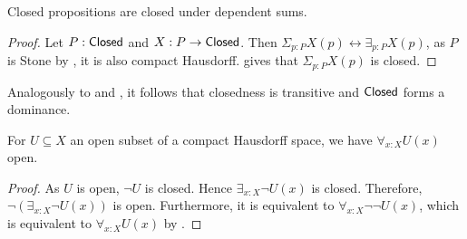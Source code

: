 \begin{corollary}\label{ClosedDependentSums}
  Closed propositions are closed under dependent sums. 
\end{corollary}
\begin{proof}
  Let $P:\mathsf{Closed}$ and $X:P \to \mathsf{Closed}$. 
  Then $\Sigma_{p:P} X(p) \leftrightarrow \exists_{p:P} X(p)$, 
  as $P$ is Stone by , it is also compact Hausdorff.
   gives that $\Sigma_{p:P} X(p)$ is closed. 
\end{proof}
\begin{remark}
  Analogously to  and , it follows that 
  closedness is transitive and $\mathsf{Closed}$ forms a dominance. 
\end{remark}
\begin{corollary}
  For $U\subseteq X$ an open subset of a compact Hausdorff space, we have 
  $\forall_{x:X} U(x)$ open. 
\end{corollary}
\begin{proof}
%
  As $U$ is open, $\neg U$ is closed. 
  Hence $\exists_{x:X} \neg U(x)$ is closed. 
  Therefore, $\neg (\exists_{x:X} \neg U(x))$ is open. 
  Furthermore, it is equivalent to $\forall_{x:X} \neg \neg U(x)$, 
  which is equivalent to $\forall_{x:X} U(x)$ by .
\end{proof}
%
